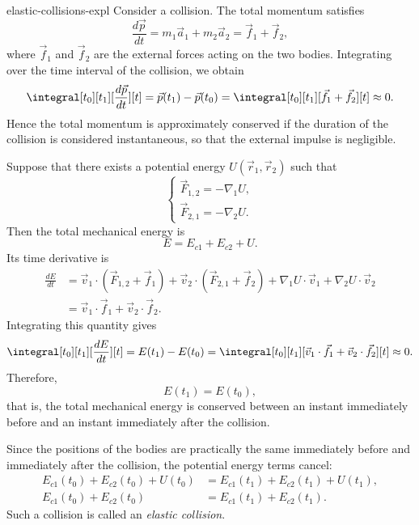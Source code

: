 \documentclass[preview]{standalone}
\begin{document}
\begin{snippet}{elastic-collisions-expl}
    Consider a collision. The total momentum satisfies
    \[
        \frac{d\vec{p}}{dt}
        =
        m_1\vec{a}_1 + m_2\vec{a}_2
        =
        \vec{f}_1 + \vec{f}_2,
    \]
    where \(\vec{f}_1\) and \(\vec{f}_2\) are the external forces acting on the two bodies.
    Integrating over the time interval of the collision, we obtain
    \[
        \integral[t_0][t_1][\frac{d\vec{p}}{dt}][t]
        =
        \vec{p}(t_1) - \vec{p}(t_0)
        =
        \integral[t_0][t_1][\vec{f}_1 + \vec{f}_2][t]
        \approx 0.
    \]
    Hence the total momentum is approximately conserved if the duration of the collision is
    considered instantaneous, so that the external impulse is negligible.

    Suppose that there exists a potential energy \(U(\vec{r}_1, \vec{r}_2)\) such that
    \[
        \begin{cases}
            \vec{F}_{1,2} = -\nabla_1 U, \\
            \vec{F}_{2,1} = -\nabla_2 U.
        \end{cases}
    \]
    Then the total mechanical energy is
    \[
        E = E_{c1} + E_{c2} + U.
    \]
    Its time derivative is
    \begin{align*}
        \frac{dE}{dt}
        &=
        \vec{v}_1 \cdot \left(\vec{F}_{1,2} + \vec{f}_1\right)
        +
        \vec{v}_2 \cdot \left(\vec{F}_{2,1} + \vec{f}_2\right)
        +
        \nabla_1 U \cdot \vec{v}_1
        +
        \nabla_2 U \cdot \vec{v}_2 \\
        &=
        \vec{v}_1 \cdot \vec{f}_1
        +
        \vec{v}_2 \cdot \vec{f}_2.
    \end{align*}
    Integrating this quantity gives
    \[
        \integral[t_0][t_1][\frac{dE}{dt}][t]
        =
        E(t_1) - E(t_0)
        =
        \integral[t_0][t_1][
            \vec{v}_1 \cdot \vec{f}_1
            +
            \vec{v}_2 \cdot \vec{f}_2
        ][t]
        \approx 0.
    \]
    Therefore,
    \[
        E(t_1) = E(t_0),
    \]
    that is, the total mechanical energy is conserved between an instant immediately before and
    an instant immediately after the collision.

    Since the positions of the bodies are practically the same immediately before and immediately
    after the collision, the potential energy terms cancel:
    \begin{align*}
        E_{c1}(t_0) + E_{c2}(t_0) + U(t_0)
        &=
        E_{c1}(t_1) + E_{c2}(t_1) + U(t_1), \\
        E_{c1}(t_0) + E_{c2}(t_0)
        &=
        E_{c1}(t_1) + E_{c2}(t_1).
    \end{align*}
    Such a collision is called an \emph{elastic collision}.
\end{snippet}
\end{document}
